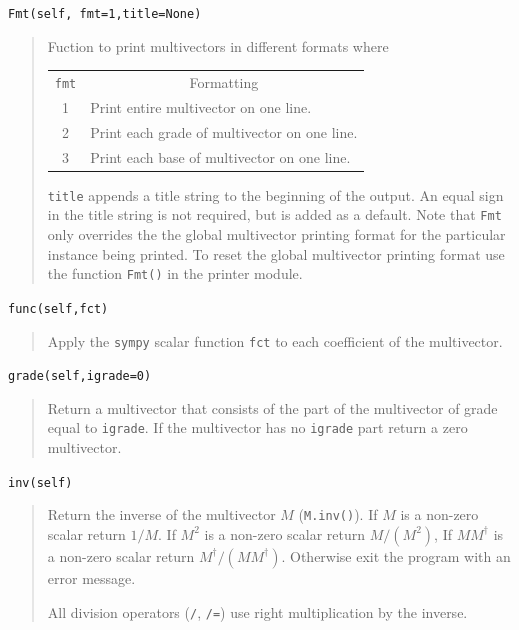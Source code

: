 \documentclass[12pt]{report}
\newcommand{\lp}{\left (}
\newcommand{\rp}{\right )}
\newcommand{\R}{\dagger}
\newcommand{\paren}[1]{\lp {#1} \rp}
\newcommand{\T}[1]{\texttt{#1}}
\begin{document}
\T{Fmt(self, fmt=1,title=None)}
\begin{quote}
    Fuction to print multivectors in different formats where
    \begin{center}
    \begin{tabular}{cl}
    \T{fmt} & \multicolumn{1}{c}{Formatting} \\
    1 & Print entire multivector on one line. \\
    2 & Print each grade of multivector on one line.\\
    3 & Print each base of multivector on one line.
    \end{tabular}
    \end{center}
    \T{title} appends a title string to the beginning of the output.  An equal sign in
    the title string is not required, but is added as a default.
    Note that \T{Fmt} only overrides the the global multivector printing format for the
    particular instance being printed.  To reset the global multivector printing format
    use the function \T{Fmt()} in the printer module.
\end{quote}

\T{func(self,fct)}
\begin{quote}
   Apply the \T{sympy} scalar function \T{fct} to each coefficient of the multivector.
\end{quote}

\T{grade(self,igrade=0)}
\begin{quote}
    Return a multivector that consists of the part of the multivector of
    grade equal to \T{igrade}.  If the multivector has no \T{igrade} part
    return a zero multivector.
\end{quote}

\T{inv(self)}
\begin{quote}
   Return the inverse of the multivector $M$ (\T{M.inv()}). If $M$ is a non-zero scalar return $1/M$.  If $M^{2}$ is a non-zero
   scalar return $M/\paren{M^{2}}$, If $MM^{\R}$ is a non-zero scalar return $M^{\R}/\paren{MM^{\R}}$.  Otherwise exit the program with
   an error message.
   
   All division operators (\T{/}, \T{/=}) use right multiplication by the inverse.
\end{quote}
\end{document}

